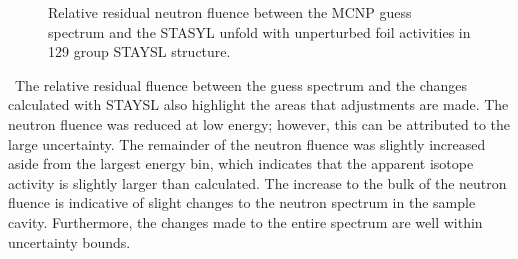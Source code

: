 \begin{figure}[!htbp]
	\centering
	\vfill
	\vfill
	\vfill
	\caption{Relative residual neutron fluence between the MCNP guess spectrum and the STASYL unfold with unperturbed foil activities in 129 group STAYSL structure.}
	\label{fig:unfold50}
\end{figure}

\ The relative residual fluence between the guess spectrum and the changes calculated with STAYSL also highlight the areas that adjustments are made. 
The neutron fluence was reduced at low energy; however, this can be attributed to the large uncertainty. The remainder of the neutron fluence was slightly increased aside from the largest energy bin, which indicates that the apparent isotope activity is slightly larger than calculated. The increase to the bulk of the neutron fluence is indicative of slight changes to the neutron spectrum in the sample cavity. Furthermore, the changes made to the entire spectrum are well within uncertainty bounds. 

